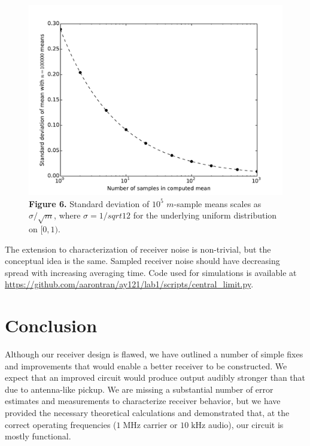\documentclass[11pt]{article}
\newcommand {\mt}{\mathrm}
\newcommand {\unit}[1]{\; \mt{#1}}
\begin{document}
\begin{figure}[h]
    \centering
    \includegraphics[scale=0.5]{scripts/allan_variance.pdf} \\
    \textbf{Figure 6.} Standard deviation of $10^5$ $m$-sample means scales as
    $\sigma / \sqrt{m}$, where $\sigma = 1/sqrt{12}$ for the underlying uniform
    distribution on $[0,1)$.
\end{figure}

The extension to characterization of receiver noise is non-trivial, but the
conceptual idea is the same.  Sampled receiver noise should have decreasing
spread with increasing averaging time.  Code used for simulations is available
at \href{https://github.com/aarontran/ay121}
{https://github.com/aarontran/ay121/lab1/scripts/central\_limit.py}.

\section{Conclusion}

Although our receiver design is flawed, we have outlined a number of simple
fixes and improvements that would enable a better receiver to be constructed.
We expect that an improved circuit would produce output audibly stronger than
that due to antenna-like pickup.  We are missing a substantial number of error
estimates and measurements to characterize receiver behavior, but we have
provided the necessary theoretical calculations and demonstrated that, at the
correct operating frequencies ($1 \unit{MHz}$ carrier or $10 \unit{kHz}$
audio), our circuit is mostly functional.
\end{document}
